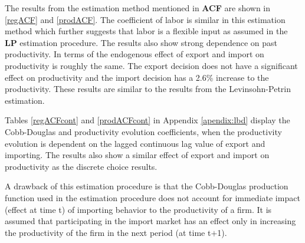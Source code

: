 \documentclass[12pt]{article}
\begin{document}
The results from the estimation method mentioned in
 \textbf{ACF} are shown in \ref{regACF} and \ref{prodACF}. The coefficient of labor is similar in this
estimation method which further suggests that labor is a flexible
input as assumed in the \textbf{LP} estimation procedure. The results also
show strong dependence on past productivity. In terms of the endogenous effect
of export and import on productivity is roughly the same. The export
decision does not have a significant effect on productivity and the
import decision has a 2.6\% increase to the productivity. These
results are similar to the results from the Levinsohn-Petrin
estimation.   %
 
 




Tables \ref{regACFcont} and \ref{prodACFcont} in Appendix \ref{apendix:lbd}  display the Cobb-Douglas and
productivity evolution
coefficients,  when the
productivity evolution is dependent on the lagged continuous lag value of
export and importing. The results also show a similar effect of export
and import on productivity as the discrete choice results.  

A drawback of this estimation procedure is that 
the Cobb-Douglas production function used in the estimation procedure  does not
account for immediate impact (effect at time t) of 
importing behavior to the productivity of a firm.  It is assumed that
participating in the import market has an effect only in increasing the
productivity of the firm in the next period (at time t$+$1). 

\end{document}
